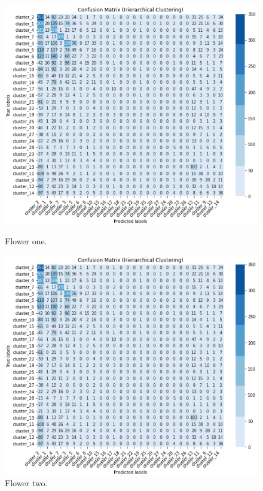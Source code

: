 \documentclass[letterpaper,9pt,twocolumn,twoside,]{pinp}
\begin{document}
\begin{figure}
\begin{center}
  \centering
  \begin{minipage}[b]{0.8\textwidth}
    \includegraphics[width=\textwidth]{images/Confusion_Matrix/Cmax_CNN_Stratified_Clean.png}
    \caption{Flower one.}
  \end{minipage}
  \hfill
  \begin{minipage}[b]{0.8\textwidth}
    \includegraphics[width=\textwidth]{images/Confusion_Matrix/Cmax_CNN_Stratified_Clean.png}
    \caption{Flower two.}
  \end{minipage}
  
\end{center}
\end{figure}

\showacknow




\end{document}
